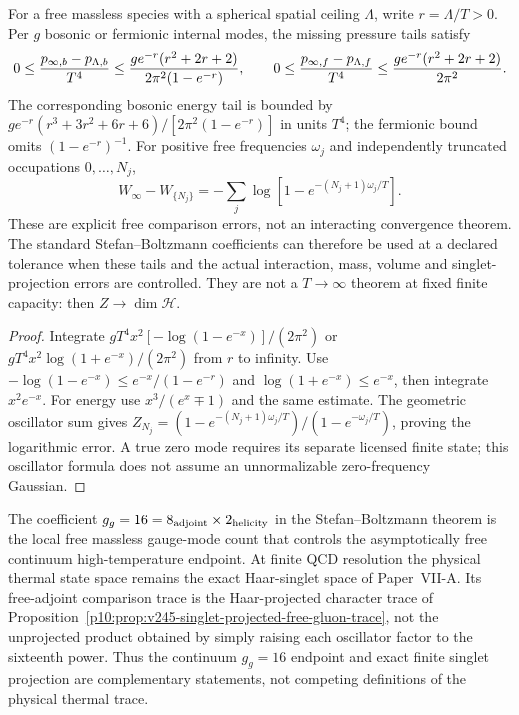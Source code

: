 \documentclass[12pt,a4paper]{article}
\begin{document}
\begin{proposition}
\label{p11:prop:v2211-fixed-ceiling-thermal-remainder}
For a free massless species with a spherical spatial ceiling $\Lambda$,
write $r=\Lambda/T>0$. Per $g$ bosonic or fermionic internal modes, the
missing pressure tails satisfy
\[
 0\le{p_{\infty,b}-p_{\Lambda,b}\over T^4}
 \le {g e^{-r}(r^2+2r+2)\over2\pi^2(1-e^{-r})},\qquad
 0\le{p_{\infty,f}-p_{\Lambda,f}\over T^4}
 \le {g e^{-r}(r^2+2r+2)\over2\pi^2}.
\]
The corresponding bosonic energy tail is bounded by
$g e^{-r}(r^3+3r^2+6r+6)/[2\pi^2(1-e^{-r})]$ in units $T^4$;
the fermionic bound omits $(1-e^{-r})^{-1}$. For positive free frequencies
$\omega_j$ and independently truncated occupations $0,\ldots,N_j$,
\[
 W_{\infty}-W_{\{N_j\}}
 =-\sum_j\log[1-e^{-(N_j+1)\omega_j/T}].
\]
These are explicit free comparison errors, not an interacting convergence
theorem. The standard Stefan--Boltzmann coefficients can therefore be used
at a declared tolerance when these tails and the actual interaction,
mass, volume and singlet-projection errors are controlled. They are not a
$T\to\infty$ theorem at fixed finite capacity: then $Z\to\dim\mathcal H$.
\end{proposition}
\begin{proof}
Integrate $gT^4x^2[-\log(1-e^{-x})]/(2\pi^2)$ or
$gT^4x^2\log(1+e^{-x})/(2\pi^2)$ from $r$ to infinity. Use
$-\log(1-e^{-x})\le e^{-x}/(1-e^{-r})$ and
$\log(1+e^{-x})\le e^{-x}$, then integrate $x^2e^{-x}$.
For energy use $x^3/(e^x\mp1)$ and the same estimate. The geometric
oscillator sum gives $Z_{N_j}=(1-e^{-(N_j+1)\omega_j/T})/
(1-e^{-\omega_j/T})$, proving the logarithmic error. A true zero mode
requires its separate licensed finite state; this oscillator formula does
not assume an unnormalizable zero-frequency Gaussian.
\end{proof}

\begin{remark}
\label{p11:rem:v245-gluon-count-singlet-thermal-firewall}
The coefficient \(g_g=16=8_{\rm adjoint}\times2_{\rm helicity}\) in the
Stefan--Boltzmann theorem is the local free massless gauge-mode count that
controls the asymptotically free continuum high-temperature endpoint.  At
finite QCD resolution the physical thermal state space remains the exact
Haar-singlet space of Paper~VII-A.  Its free-adjoint comparison trace is the
Haar-projected character trace of
Proposition~\ref{p10:prop:v245-singlet-projected-free-gluon-trace}, not the
unprojected product obtained by simply raising each oscillator factor to the
sixteenth power.  Thus the continuum \(g_g=16\) endpoint and exact finite
singlet projection are complementary statements, not competing definitions
of the physical thermal trace.
\end{remark}
\end{document}
